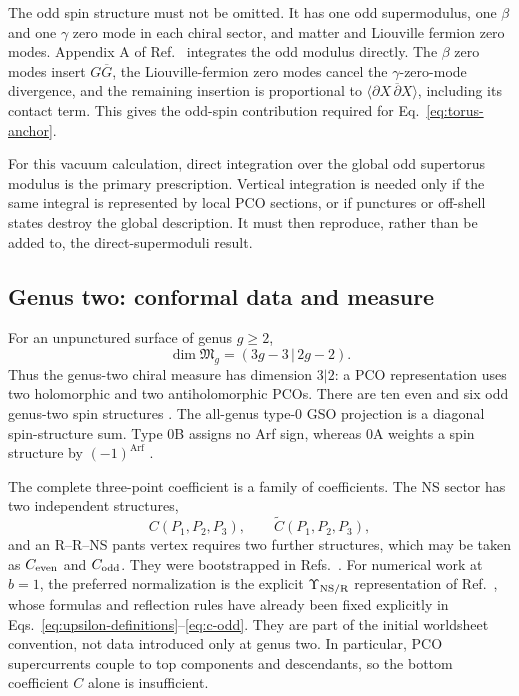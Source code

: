 \documentclass[11pt]{article}
\begin{document}
The odd spin structure must not be omitted.  It has one odd supermodulus,
one $\beta$ and one $\gamma$ zero mode in each chiral sector, and matter and
Liouville fermion zero modes.  Appendix A of
Ref.~\cite{DouglasEtAl2003NewHat} integrates the odd modulus directly.  The
$\beta$ zero modes insert $G\overline G$, the Liouville-fermion zero modes
cancel the $\gamma$-zero-mode divergence, and the remaining insertion is
proportional to $\langle\partial X\,\overline\partial X\rangle$, including
its contact term.  This gives the odd-spin contribution required for
Eq.~\eqref{eq:torus-anchor}.

For this vacuum calculation, direct integration over the global odd
supertorus modulus is the primary prescription.  Vertical integration is
needed only if the same integral is represented by local PCO sections, or if
punctures or off-shell states destroy the global description.  It must then
reproduce, rather than be added to, the direct-supermoduli result.

\subsection{Genus two: conformal data and measure}

For an unpunctured surface of genus $g\ge2$,
\begin{equation}
 \dim\mathfrak M_g=(3g-3\,|\,2g-2).
 \label{eq:supermoduli-dimension}
\end{equation}
Thus the genus-two chiral measure has dimension $3|2$: a PCO
representation uses two holomorphic and two antiholomorphic PCOs.  There are
ten even and six odd genus-two spin structures
\cite{Witten2012SuperRiemannSurfaces}.  The all-genus type-0 GSO projection
is a diagonal spin-structure sum.  Type 0B assigns no Arf sign, whereas 0A
weights a spin structure by $(-1)^{\operatorname{Arf}}$
\cite{KaidiEtAl2020TopologicalSuperconductors}.

The complete three-point coefficient is a family of coefficients.  The
NS sector has two independent structures,
\begin{equation}
 C(P_1,P_2,P_3),\qquad \widetilde C(P_1,P_2,P_3),
\end{equation}
and an R--R--NS pants vertex requires two further structures, which may be
taken as $C_{\rm even}$ and $C_{\rm odd}$.  They were bootstrapped in
Refs.~\cite{RashkovStanishkov1996ThreePoint,Poghossian1997StructureConstants}.
For numerical work at $b=1$, the preferred normalization is the explicit
$\Upsilon_{\rm NS/R}$ representation of
Ref.~\cite{BalthazarRodriguezYin2023SMatrix}, whose formulas and reflection
rules have already been fixed explicitly in
Eqs.~\eqref{eq:upsilon-definitions}--\eqref{eq:c-odd}.
They are part of the initial worldsheet convention, not data introduced only
at genus two.  In particular, PCO supercurrents couple to top components and
descendants, so the bottom coefficient $C$ alone is insufficient.
\end{document}
